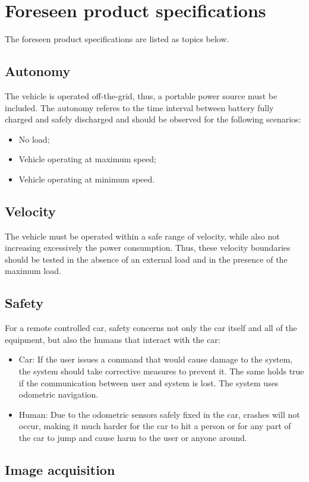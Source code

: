 \section{Foreseen product specifications}
\label{sec:org31f7574}
The foreseen product specifications are listed as topics below.

\subsection{Autonomy}
\label{sec:org7364ba5}
The vehicle is operated off-the-grid, thus, a portable power source must be included. The autonomy referes to the time interval between battery fully charged and safely discharged and should be observed for the following scenarios:
\begin{itemize}
\item No load;
\item Vehicle operating at maximum speed;
\item Vehicle operating at minimum speed.
\end{itemize}
\subsection{Velocity}
\label{sec:org08718bc}
The vehicle must be operated within a safe range of velocity, while also not increasing excessively the power consumption. Thus, these velocity boundaries should be tested in the absence of an external load and in the presence of the maximum load.
\subsection{Safety}
\label{sec:org83942c3}
For a remote controlled car, safety concerns not only the car itself and all of the equipment, but also the humans that interact with the car:
\begin{itemize}
\item Car: If the user issues a command that would cause damage to the system, the
system should take corrective measures to prevent it. The same holds true if
the communication between user and system is lost. The system uses odometric navigation.
\item Human: Due to the odometric sensors safely fixed in the car, crashes will not occur, making it much harder for the car to hit a person or for any part of the car to jump and cause harm to the user or anyone around.
\end{itemize}
\subsection{Image acquisition}
\label{sec:orgb6a5f66}
